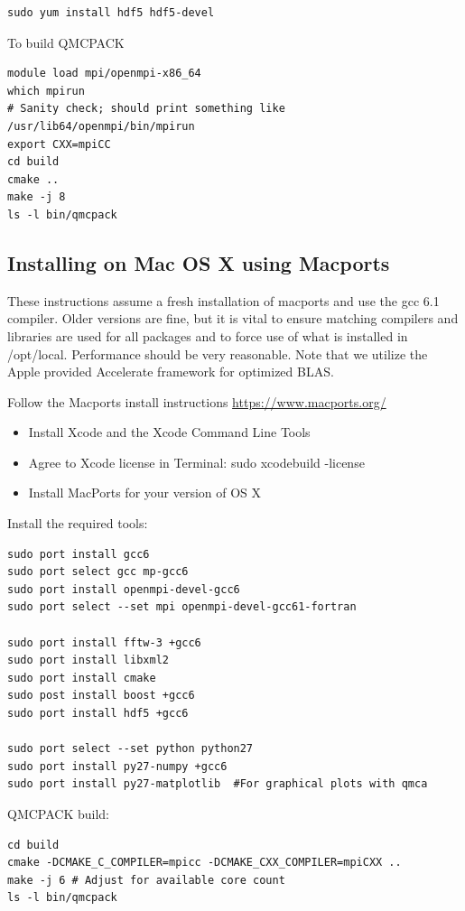 \verbatimfont{\footnotesize}
\begin{verbatim}
sudo yum install hdf5 hdf5-devel
\end{verbatim}

To build QMCPACK
\verbatimfont{\footnotesize}
\begin{verbatim}
module load mpi/openmpi-x86_64
which mpirun
# Sanity check; should print something like   /usr/lib64/openmpi/bin/mpirun
export CXX=mpiCC
cd build
cmake ..
make -j 8
ls -l bin/qmcpack
\end{verbatim}

\subsection{Installing on Mac OS X using Macports}
These instructions assume a fresh installation of macports
and use the gcc 6.1 compiler. Older versions are fine, but it is vital to ensure
matching compilers and libraries are used for all
packages and to force use of what is installed in /opt/local.  Performance should be very reasonable.
Note that we utilize the Apple provided Accelerate framework for
optimized BLAS.

Follow the Macports install instructions \url{https://www.macports.org/}

\begin{itemize}
\item Install Xcode and the Xcode Command Line Tools
\item Agree to Xcode license in Terminal: sudo xcodebuild -license
\item Install MacPorts for your version of OS X
\end{itemize}


Install the required tools:

\verbatimfont{\footnotesize}
\begin{verbatim}
sudo port install gcc6
sudo port select gcc mp-gcc6
sudo port install openmpi-devel-gcc6
sudo port select --set mpi openmpi-devel-gcc61-fortran

sudo port install fftw-3 +gcc6
sudo port install libxml2
sudo port install cmake
sudo post install boost +gcc6
sudo port install hdf5 +gcc6

sudo port select --set python python27
sudo port install py27-numpy +gcc6
sudo port install py27-matplotlib  #For graphical plots with qmca
\end{verbatim}

QMCPACK build:
\verbatimfont{\footnotesize}
\begin{verbatim}
cd build
cmake -DCMAKE_C_COMPILER=mpicc -DCMAKE_CXX_COMPILER=mpiCXX ..
make -j 6 # Adjust for available core count
ls -l bin/qmcpack
\end{verbatim}

